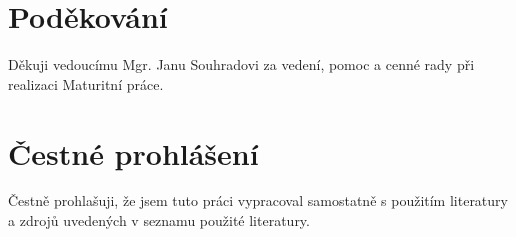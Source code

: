 \documentclass[main.tex]{subfiles}
\begin{document}
\section*{Poděkování}
Děkuji vedoucímu Mgr. Janu Souhradovi za vedení, pomoc a cenné rady při realizaci Maturitní práce. 

\section*{Čestné prohlášení}
Čestně prohlašuji, že jsem tuto práci vypracoval samostatně s použitím literatury a zdrojů uvedených v seznamu použité literatury.
\end{document}
